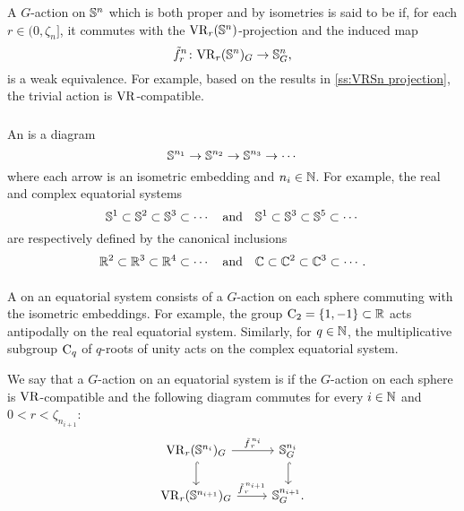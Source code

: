 A \(G\)-action on \(\mathbb{S}^n\) which is both proper and by isometries is said to be  if, for each $r \in (0, \zeta_n]$, it commutes with the \(\mathrm{VR}_r(\mathbb{S}^n)\)-projection and the induced map
\[
\tilde f_r^n \colon \mathrm{VR}_r(\mathbb{S}^n)_G \to \mathbb{S}^n_G,
\]
is a weak equivalence.
For example, based on the results in \cref{ss:VRSn projection}, the trivial action is \(\mathrm{VR}\)-compatible.

\subsubsection{}

An  is a diagram
\[
\mathbb{S}^{n_1} \to \mathbb{S}^{n_2} \to \mathbb{S}^{n_3} \to \dotsb
\]
where each arrow is an isometric embedding and $n_i \in \mathbb{N}$.
For example, the real and complex equatorial systems
\[
\mathbb{S}^1 \subset \mathbb{S}^2 \subset \mathbb{S}^3 \subset \dotsb
\quad\text{and}\quad
\mathbb{S}^1 \subset \mathbb{S}^3 \subset \mathbb{S}^5 \subset \dotsb
\]
are respectively defined by the canonical inclusions
\[
\mathbb{R}^2 \subset \mathbb{R}^3 \subset \mathbb{R}^4 \subset \dotsb
\quad\text{and}\quad
\mathbb{C} \subset \mathbb{C}^2 \subset \mathbb{C}^3 \subset \dotsb.
\]

\subsubsection{}
\label{subsub:system VR compatible}

A  on an equatorial system consists of a \(G\)-action on each sphere commuting with the isometric embeddings.
For example, the group \(\mathrm{C}_2 = \{1,-1\} \subset \mathbb{R}\) acts antipodally on the real equatorial system.
Similarly, for \(q \in \mathbb{N}\), the multiplicative subgroup \(\mathrm{C}_q\) of \(q\)-roots of unity acts on the complex equatorial system.

We say that a \(G\)-action on an equatorial system is  if the \(G\)-action on each sphere is \(\mathrm{VR}\)-compatible and the following diagram commutes for every \(i \in \mathbb{N}\) and $0 < r < \zeta_{n_{i+1}}$:
\begin{equation}\label{eq:VR_quotient}
    \begin{tikzcd}
	\VR_r(\bS^{n_i})_G
	\ar[d, hook]
	\ar[r, "\tilde f_{\,r}^{\,n_i}" above]
	&
	\bS^{n_i}_G
	\ar[d, hook]
	\\
	\VR_r(\bS^{n_{i+1}})_G
	\ar[r, "\tilde f_{\,r}^{\,n_{i+1}}" above]
	&
	\bS^{n_{i+1}}_G.
\end{tikzcd}
\end{equation}

